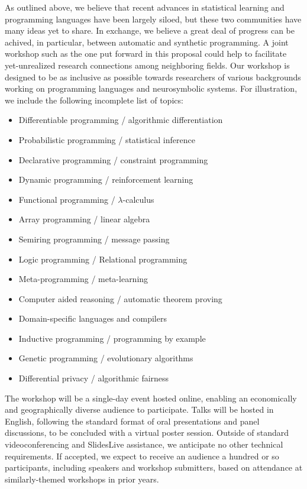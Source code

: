 \documentclass{article}
\begin{document}
    As outlined above, we believe that recent advances in statistical learning and programming languages have been largely siloed, but these two communities have many ideas yet to share. In exchange, we believe a great deal of progress can be achived, in particular, between automatic and synthetic programming. A joint workshop such as the one put forward in this proposal could help to facilitate yet-unrealized research connections among neighboring fields. Our workshop is designed to be as inclusive as possible towards researchers of various backgrounds working on programming languages and neurosymbolic systems. For illustration, we include the following incomplete list of topics:

    \begin{itemize}
      \item Differentiable programming / algorithmic differentiation
      \item Probabilistic programming / statistical inference
      \item Declarative programming / constraint programming
      \item Dynamic programming / reinforcement learning
      \item Functional programming / $\lambda$-calculus
      \item Array programming / linear algebra
      \item Semiring programming / message passing
      \item Logic programming / Relational programming
      \item Meta-programming / meta-learning
      \item Computer aided reasoning / automatic theorem proving
      \item Domain-specific languages and compilers
      \item Inductive programming / programming by example
      \item Genetic programming / evolutionary algorithms
      \item Differential privacy / algorithmic fairness
    \end{itemize}

    The workshop will be a single-day event hosted online, enabling an economically and geographically diverse audience to participate. Talks will be hosted in English, following the standard format of oral presentations and panel discussions, to be concluded with a virtual poster session. Outside of standard videoconferencing and SlidesLive assistance, we anticipate no other technical requirements. If accepted, we expect to receive an audience a hundred or so participants, including speakers and workshop submitters, based on attendance at similarly-themed workshops in prior years.
\end{document}
